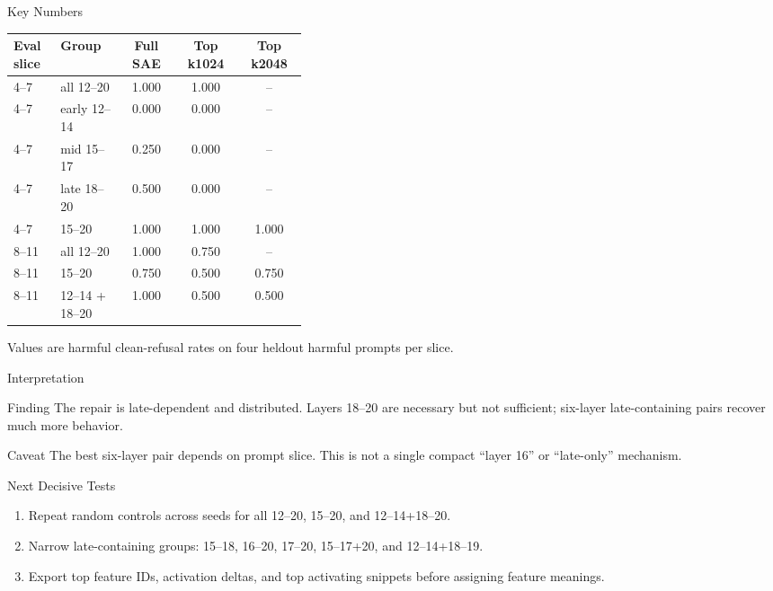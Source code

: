 \documentclass[aspectratio=169]{beamer}
\begin{document}
\begin{frame}{Key Numbers}
  \small
  \begin{tabular}{p{0.16\linewidth}p{0.22\linewidth}ccc}
    \toprule
    Eval slice & Group & Full SAE & Top k1024 & Top k2048 \\
    \midrule
    4--7 & all 12--20 & 1.000 & 1.000 & -- \\
    4--7 & early 12--14 & 0.000 & 0.000 & -- \\
    4--7 & mid 15--17 & 0.250 & 0.000 & -- \\
    4--7 & late 18--20 & 0.500 & 0.000 & -- \\
    4--7 & 15--20 & 1.000 & 1.000 & 1.000 \\
    8--11 & all 12--20 & 1.000 & 0.750 & -- \\
    8--11 & 15--20 & 0.750 & 0.500 & 0.750 \\
    8--11 & 12--14 + 18--20 & 1.000 & 0.500 & 0.500 \\
    \bottomrule
  \end{tabular}

  \vspace{0.25cm}
  {\small Values are harmful clean-refusal rates on four heldout harmful prompts per slice.}
\end{frame}

\begin{frame}{Interpretation}
  \begin{block}{Finding}
    The repair is late-dependent and distributed. Layers 18--20 are necessary but not sufficient; six-layer late-containing pairs recover much more behavior.
  \end{block}

  \begin{block}{Caveat}
    The best six-layer pair depends on prompt slice. This is not a single compact ``layer 16'' or ``late-only'' mechanism.
  \end{block}
\end{frame}

\begin{frame}{Next Decisive Tests}
  \begin{enumerate}
    \item Repeat random controls across seeds for all 12--20, 15--20, and 12--14+18--20.
    \item Narrow late-containing groups: 15--18, 16--20, 17--20, 15--17+20, and 12--14+18--19.
    \item Export top feature IDs, activation deltas, and top activating snippets before assigning feature meanings.
  \end{enumerate}
\end{frame}
\end{document}
